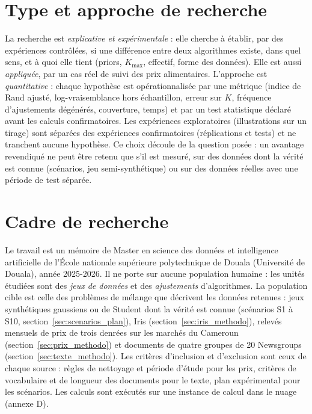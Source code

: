 \section{Type et approche de recherche}\label{sec:type_recherche}
La recherche est \emph{explicative et expérimentale} : elle cherche à établir, par des expériences contrôlées, si une différence entre deux algorithmes existe, dans quel sens, et à quoi elle tient (priors, $K_{\max}$, effectif, forme des données). Elle est aussi \emph{appliquée}, par un cas réel de suivi des prix alimentaires. L'approche est \emph{quantitative} : chaque hypothèse est opérationnalisée par une métrique (indice de Rand ajusté, log-vraisemblance hors échantillon, erreur sur $K$, fréquence d'ajustements dégénérés, couverture, temps) et par un test statistique déclaré avant les calculs confirmatoires. Les expériences exploratoires (illustrations sur un tirage) sont séparées des expériences confirmatoires (réplications et tests) et ne tranchent aucune hypothèse. Ce choix découle de la question posée : un avantage revendiqué ne peut être retenu que s'il est mesuré, sur des données dont la vérité est connue (scénarios, jeu semi-synthétique) ou sur des données réelles avec une période de test séparée.

\section{Cadre de recherche}\label{sec:cadre_recherche}
Le travail est un mémoire de Master en science des données et intelligence artificielle de l'École nationale supérieure polytechnique de Douala (Université de Douala), année 2025-2026. Il ne porte sur aucune population humaine : les unités étudiées sont des \emph{jeux de données} et des \emph{ajustements} d'algorithmes. La population cible est celle des problèmes de mélange que décrivent les données retenues : jeux synthétiques gaussiens ou de Student dont la vérité est connue (scénarios S1 à S10, section~\ref{sec:scenarios_plan}), Iris (section~\ref{sec:iris_methodo}), relevés mensuels de prix de trois denrées sur les marchés du Cameroun (section~\ref{sec:prix_methodo}) et documents de quatre groupes de 20 Newsgroups (section~\ref{sec:texte_methodo}). Les critères d'inclusion et d'exclusion sont ceux de chaque source : règles de nettoyage et période d'étude pour les prix, critères de vocabulaire et de longueur des documents pour le texte, plan expérimental pour les scénarios. Les calculs sont exécutés sur une instance de calcul dans le nuage (annexe D).

